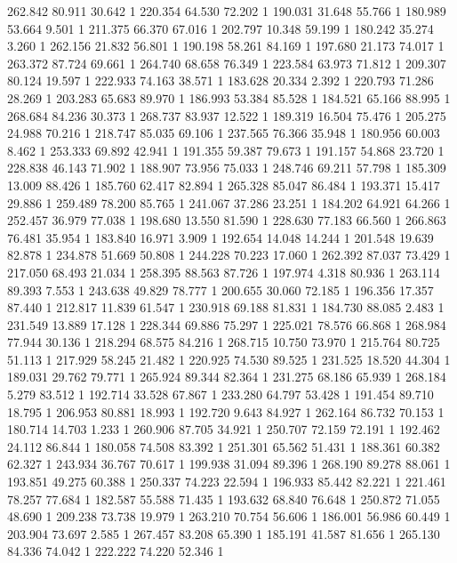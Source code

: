 	262.842	80.911	30.642	1
	220.354	64.530	72.202	1
	190.031	31.648	55.766	1
	180.989	53.664	9.501	1
	211.375	66.370	67.016	1
	202.797	10.348	59.199	1
	180.242	35.274	3.260	1
	262.156	21.832	56.801	1
	190.198	58.261	84.169	1
	197.680	21.173	74.017	1
	263.372	87.724	69.661	1
	264.740	68.658	76.349	1
	223.584	63.973	71.812	1
	209.307	80.124	19.597	1
	222.933	74.163	38.571	1
	183.628	20.334	2.392	1
	220.793	71.286	28.269	1
	203.283	65.683	89.970	1
	186.993	53.384	85.528	1
	184.521	65.166	88.995	1
	268.684	84.236	30.373	1
	268.737	83.937	12.522	1
	189.319	16.504	75.476	1
	205.275	24.988	70.216	1
	218.747	85.035	69.106	1
	237.565	76.366	35.948	1
	180.956	60.003	8.462	1
	253.333	69.892	42.941	1
	191.355	59.387	79.673	1
	191.157	54.868	23.720	1
	228.838	46.143	71.902	1
	188.907	73.956	75.033	1
	248.746	69.211	57.798	1
	185.309	13.009	88.426	1
	185.760	62.417	82.894	1
	265.328	85.047	86.484	1
	193.371	15.417	29.886	1
	259.489	78.200	85.765	1
	241.067	37.286	23.251	1
	184.202	64.921	64.266	1
	252.457	36.979	77.038	1
	198.680	13.550	81.590	1
	228.630	77.183	66.560	1
	266.863	76.481	35.954	1
	183.840	16.971	3.909	1
	192.654	14.048	14.244	1
	201.548	19.639	82.878	1
	234.878	51.669	50.808	1
	244.228	70.223	17.060	1
	262.392	87.037	73.429	1
	217.050	68.493	21.034	1
	258.395	88.563	87.726	1
	197.974	4.318	80.936	1
	263.114	89.393	7.553	1
	243.638	49.829	78.777	1
	200.655	30.060	72.185	1
	196.356	17.357	87.440	1
	212.817	11.839	61.547	1
	230.918	69.188	81.831	1
	184.730	88.085	2.483	1
	231.549	13.889	17.128	1
	228.344	69.886	75.297	1
	225.021	78.576	66.868	1
	268.984	77.944	30.136	1
	218.294	68.575	84.216	1
	268.715	10.750	73.970	1
	215.764	80.725	51.113	1
	217.929	58.245	21.482	1
	220.925	74.530	89.525	1
	231.525	18.520	44.304	1
	189.031	29.762	79.771	1
	265.924	89.344	82.364	1
	231.275	68.186	65.939	1
	268.184	5.279	83.512	1
	192.714	33.528	67.867	1
	233.280	64.797	53.428	1
	191.454	89.710	18.795	1
	206.953	80.881	18.993	1
	192.720	9.643	84.927	1
	262.164	86.732	70.153	1
	180.714	14.703	1.233	1
	260.906	87.705	34.921	1
	250.707	72.159	72.191	1
	192.462	24.112	86.844	1
	180.058	74.508	83.392	1
	251.301	65.562	51.431	1
	188.361	60.382	62.327	1
	243.934	36.767	70.617	1
	199.938	31.094	89.396	1
	268.190	89.278	88.061	1
	193.851	49.275	60.388	1
	250.337	74.223	22.594	1
	196.933	85.442	82.221	1
	221.461	78.257	77.684	1
	182.587	55.588	71.435	1
	193.632	68.840	76.648	1
	250.872	71.055	48.690	1
	209.238	73.738	19.979	1
	263.210	70.754	56.606	1
	186.001	56.986	60.449	1
	203.904	73.697	2.585	1
	267.457	83.208	65.390	1
	185.191	41.587	81.656	1
	265.130	84.336	74.042	1
	222.222	74.220	52.346	1
